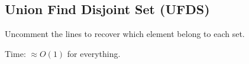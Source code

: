 \subsection{Union Find Disjoint Set (UFDS)}

Uncomment the lines to recover which element belong to each set.

Time: $\approx O(1)$ for everything.

